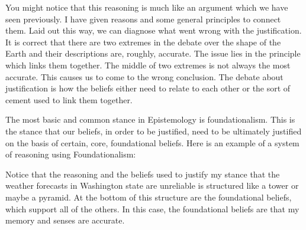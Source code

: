 
You might notice that this reasoning is much like an argument which we have seen previously. I have given reasons and some general principles to connect them. Laid out this way, we can diagnose what went wrong with the justification. It is correct that there are two extremes in the debate over the shape of the Earth and their descriptions are, roughly, accurate. The issue lies in the principle which links them together. The middle of two extremes is not always the most accurate. This causes us to come to the wrong conclusion. The debate about justification is how the beliefs either need to relate to each other or the sort of cement used to link them together.

The most basic and common stance in Epistemology is \Gls{foundationalism}. This is the stance that our beliefs, in order to be justified, need to be ultimately justified on the basis of certain, core, foundational beliefs. Here is an example of a system of reasoning using Foundationalism: 


Notice that the reasoning and the beliefs used to justify my stance that the weather forecasts in Washington state are unreliable is structured like a tower or maybe a pyramid. At the bottom of this structure are the foundational beliefs, which support all of the others. In this case, the foundational beliefs are that my memory and senses are accurate. 

